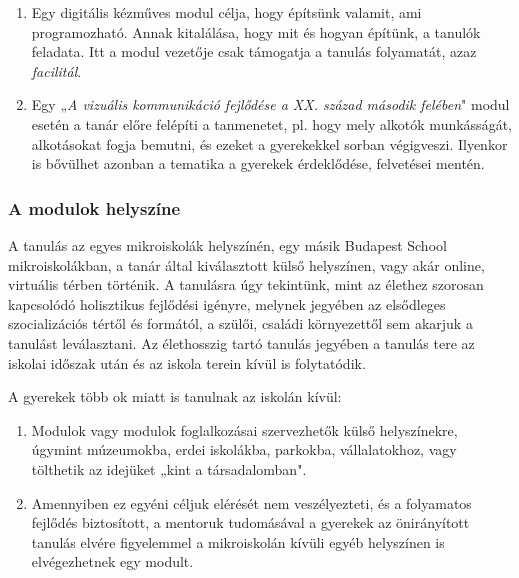 \begin{enumerate}
      \item Egy digitális kézműves modul célja, hogy építsünk valamit, ami
            programozható. Annak kitalálása, hogy mit és hogyan építünk, a
            tanulók
            feladata. Itt a modul vezetője csak támogatja a tanulás folyamatát,
            azaz
            \emph{facilitál}.

      \item Egy „\emph{A vizuális kommunikáció fejlődése a XX. század második
                  felében}"
            modul esetén a tanár előre felépíti a tanmenetet, pl. hogy mely
            alkotók munkásságát,
            alkotásokat
            fogja bemutni, és
            ezeket a gyerekekkel sorban végigveszi. Ilyenkor is bővülhet
            azonban a tematika a gyerekek érdeklődése, felvetései mentén.

\end{enumerate}

\subsubsection{A modulok helyszíne}

A tanulás az egyes mikroiskolák helyszínén, egy másik Budapest School
mikroiskolákban, a tanár által kiválasztott külső helyszínen,
vagy akár online, virtuális térben történik. A tanulásra úgy tekintünk, mint az
élethez szorosan kapcsolódó holisztikus fejlődési igényre,
melynek jegyében az elsődleges szocializációs tértől és formától, a szülői,
családi környezettől sem akarjuk a tanulást leválasztani. Az élethosszig
tartó tanulás jegyében a tanulás tere az iskolai időszak után és az
iskola terein kívül is folytatódik.

A gyerekek több ok miatt is tanulnak az iskolán kívül:

\begin{enumerate}
      \item Modulok vagy modulok foglalkozásai szervezhetők külső helyszínekre,
            úgymint múzeumokba, erdei
            iskolákba, parkokba, vállalatokhoz, vagy tölthetik az idejüket
            „kint a
            társadalomban".

      \item Amennyiben ez egyéni céljuk elérését nem veszélyezteti, és a
            folyamatos fejlődés biztosított, a mentoruk tudomásával a gyerekek
            az
            önirányított tanulás elvére figyelemmel a mikroiskolán kívüli egyéb
            helyszínen
            is elvégezhetnek egy modult.
\end{enumerate}


